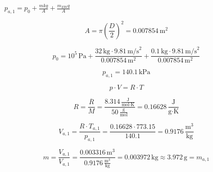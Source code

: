 

\item[a)] $p_{a,1} = p_0 + \frac{m k g}{A} + \frac{m_{EW} g}{A}$
    
    \[
    A = \pi \left( \frac{D}{2} \right)^2 = 0.007854 \, \text{m}^2
    \]
    
    \[
    p_0 = 10^5 \, \text{Pa} + \frac{32 \, \text{kg} \cdot 9.81 \, \text{m/s}^2}{0.007854 \, \text{m}^2} + \frac{0.1 \, \text{kg} \cdot 9.81 \, \text{m/s}^2}{0.007854 \, \text{m}^2}
    \]
    
    \[
    p_{a,1} = 140.1 \, \text{kPa}
    \]
    
    \[
    p \cdot V = R \cdot T
    \]
    
    \[
    R = \frac{\overline{R}}{M} = \frac{8.314 \, \frac{\text{J}}{\text{mol} \cdot \text{K}}}{50 \, \frac{\text{g}}{\text{mol}}} = 0.16628 \, \frac{\text{J}}{\text{g} \cdot \text{K}}
    \]
    
    \[
    V_{a,1} = \frac{R \cdot T_{a,1}}{p_{a,1}} = \frac{0.16628 \cdot 773.15}{140.1} = 0.9176 \, \frac{\text{m}^3}{\text{kg}}
    \]
    
    \[
    m = \frac{V_{a,1}}{V_{a,1}} = \frac{0.003316 \, \text{m}^3}{0.9176 \, \frac{\text{m}^3}{\text{kg}}} = 0.003972 \, \text{kg} \approx 3.972 \, \text{g} = m_{a,1}
    \]